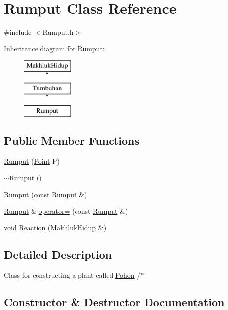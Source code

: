 \hypertarget{class_rumput}{}\section{Rumput Class Reference}
\label{class_rumput}


{\ttfamily \#include $<$Rumput.\+h$>$}

Inheritance diagram for Rumput\+:\begin{figure}[H]
\begin{center}
\leavevmode
\includegraphics[height=3.000000cm]{class_rumput}
\end{center}
\end{figure}
\subsection*{Public Member Functions}
\begin{DoxyCompactItemize}
\item 
\hyperlink{class_rumput_ae3ca65880bbe893a3c5845bb734a3270}{Rumput} (\hyperlink{class_point}{Point} P)
\item 
\hyperlink{class_rumput_af6734c13f61edd0538c9e0c92863b753}{$\sim$\+Rumput} ()
\item 
\hyperlink{class_rumput_ada42c7396802450adab3b70cc901820f}{Rumput} (const \hyperlink{class_rumput}{Rumput} \&)
\item 
\hyperlink{class_rumput}{Rumput} \& \hyperlink{class_rumput_a5e6f6663f305dd767b4430639b37bf7d}{operator=} (const \hyperlink{class_rumput}{Rumput} \&)
\item 
void \hyperlink{class_rumput_ab09bf354ca4ceb08cb023ac068a42d90}{Reaction} (\hyperlink{class_makhluk_hidup}{Makhluk\+Hidup} \&)
\end{DoxyCompactItemize}


\subsection{Detailed Description}
Class for constructing a plant called \hyperlink{class_pohon}{Pohon} /$\ast$ 

\subsection{Constructor \& Destructor Documentation}
